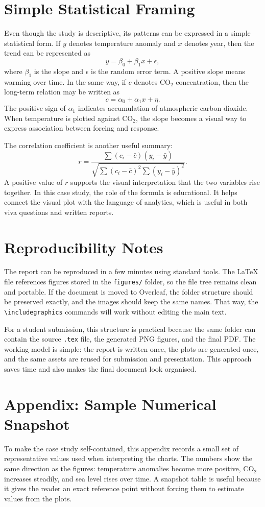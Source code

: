 \documentclass[conference]{IEEEtran}
\begin{document}
\section{Simple Statistical Framing}
Even though the study is descriptive, its patterns can be expressed in a simple statistical form. If $y$ denotes temperature anomaly and $x$ denotes year, then the trend can be represented as
\[
y = \beta_0 + \beta_1 x + \epsilon,
\]
where $\beta_1$ is the slope and $\epsilon$ is the random error term. A positive slope means warming over time. In the same way, if $c$ denotes CO$_2$ concentration, then the long-term relation may be written as
\[
c = \alpha_0 + \alpha_1 x + \eta.
\]
The positive sign of $\alpha_1$ indicates accumulation of atmospheric carbon dioxide. When temperature is plotted against CO$_2$, the slope becomes a visual way to express association between forcing and response.

The correlation coefficient is another useful summary:
\[
r = \frac{\sum (c_i - \bar{c})(y_i - \bar{y})}{\sqrt{\sum (c_i - \bar{c})^2 \sum (y_i - \bar{y})^2}}.
\]
A positive value of $r$ supports the visual interpretation that the two variables rise together. In this case study, the role of the formula is educational. It helps connect the visual plot with the language of analytics, which is useful in both viva questions and written reports.

\section{Reproducibility Notes}
The report can be reproduced in a few minutes using standard tools. The LaTeX file references figures stored in the \texttt{figures/} folder, so the file tree remains clean and portable. If the document is moved to Overleaf, the folder structure should be preserved exactly, and the images should keep the same names. That way, the \texttt{\textbackslash includegraphics} commands will work without editing the main text.

For a student submission, this structure is practical because the same folder can contain the source \texttt{.tex} file, the generated PNG figures, and the final PDF. The working model is simple: the report is written once, the plots are generated once, and the same assets are reused for submission and presentation. This approach saves time and also makes the final document look organised.



\clearpage
\section{Appendix: Sample Numerical Snapshot}
To make the case study self-contained, this appendix records a small set of representative values used when interpreting the charts. The numbers show the same direction as the figures: temperature anomalies become more positive, CO$_2$ increases steadily, and sea level rises over time. A snapshot table is useful because it gives the reader an exact reference point without forcing them to estimate values from the plots.
\end{document}
